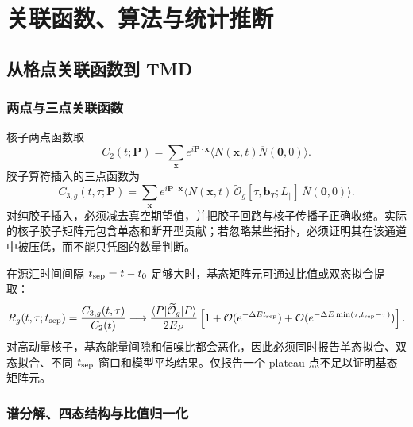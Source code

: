 \documentclass[UTF8,12pt,a4paper,twoside,openany]{ctexbook}
\newcommand{\bT}{\boldsymbol b_T}
\newcommand{\Oq}{\widetilde{\mathcal O}_{g}}
\begin{document}
\clearpage


\clearpage
\part{关联函数、算法与统计推断}
\chapter{从格点关联函数到 TMD}

\section{两点与三点关联函数}

核子两点函数取
\begin{equation}
  C_2(t;\mathbf P)
  =\sum_{\mathbf x}e^{i\mathbf P\cdot\mathbf x}
  \langle N(\mathbf x,t)\overline N(\mathbf 0,0)\rangle .
  \label{eq:two-point}
\end{equation}
胶子算符插入的三点函数为
\begin{equation}
  C_{3,g}(t,\tau;\mathbf P)
  =\sum_{\mathbf x}e^{i\mathbf P\cdot\mathbf x}
  \langle N(\mathbf x,t)\,
  \Oq[\tau,\bT;L_\parallel]\,
  \overline N(\mathbf 0,0)\rangle .
  \label{eq:three-point}
\end{equation}
对纯胶子插入，必须减去真空期望值，并把胶子回路与核子传播子正确收缩。实际的核子胶子矩阵元包含单态和断开型贡献；若忽略某些拓扑，必须证明其在该通道中被压低，而不能只凭图的数量判断。

在源汇时间间隔 \(t_{\rm sep}=t-t_0\) 足够大时，基态矩阵元可通过比值或双态拟合提取：
\begin{equation}
  R_g(t,\tau;t_{\rm sep})
  =\frac{C_{3,g}(t,\tau)}{C_2(t)}
  \longrightarrow
  \frac{\langle P|\Oq|P\rangle}{2E_P}
  \left[1+\mathcal O(e^{-\Delta Et_{\rm sep}})
  +\mathcal O(e^{-\Delta E\min(\tau,t_{\rm sep}-\tau)})\right].
  \label{eq:ratio}
\end{equation}
对高动量核子，基态能量间隙和信噪比都会恶化，因此必须同时报告单态拟合、双态拟合、不同 \(t_{\rm sep}\) 窗口和模型平均结果。仅报告一个 plateau 点不足以证明基态矩阵元。

\section{谱分解、四态结构与比值归一化}
\end{document}
